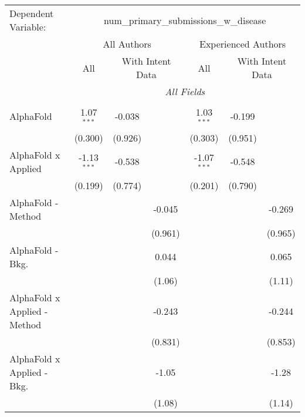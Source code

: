 \begingroup
\centering
\begin{tabular}{lcccccc}
   \tabularnewline \midrule \midrule
   Dependent Variable: & \multicolumn{6}{c}{num\_primary\_submissions\_w\_disease}\\
 & \multicolumn{3}{c}{All Authors} & \multicolumn{3}{c}{Experienced Authors} \\
\cmidrule(lr){2-4} \cmidrule(lr){5-7}
 & \multicolumn{1}{c}{All} & \multicolumn{2}{c}{With Intent Data} & \multicolumn{1}{c}{All} & \multicolumn{2}{c}{With Intent Data} \\
\cmidrule(lr){2-2} \cmidrule(lr){3-4} \cmidrule(lr){5-5} \cmidrule(lr){6-7}
 & \multicolumn{6}{c}{\textit{All Fields}} \\ \\
   AlphaFold                    & 1.07$^{***}$  & -0.038  &               & 1.03$^{***}$  & -0.199  &   \\   
                                & (0.300)       & (0.926) &               & (0.303)       & (0.951) &   \\   
   AlphaFold x Applied          & -1.13$^{***}$ & -0.538  &               & -1.07$^{***}$ & -0.548  &   \\   
                                & (0.199)       & (0.774) &               & (0.201)       & (0.790) &   \\   
   AlphaFold - Method           &               &         & -0.045        &               &         & -0.269\\   
                                &               &         & (0.961)       &               &         & (0.965)\\   
   AlphaFold - Bkg.             &               &         & 0.044         &               &         & 0.065\\   
                                &               &         & (1.06)        &               &         & (1.11)\\   
   AlphaFold x Applied - Method &               &         & -0.243        &               &         & -0.244\\   
                                &               &         & (0.831)       &               &         & (0.853)\\   
   AlphaFold x Applied - Bkg.   &               &         & -1.05         &               &         & -1.28\\   
                                &               &         & (1.08)        &               &         & (1.14)\\   

\end{tabular}
